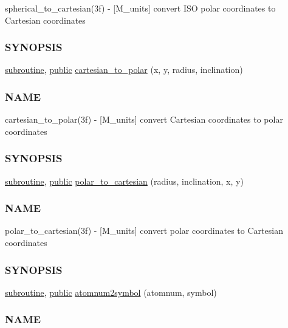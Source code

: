 \begin{DoxyCompactItemize}
\begin{DoxyCompactList}
spherical\+\_\+to\+\_\+cartesian(3f) -\/ \mbox{[}M\+\_\+units\mbox{]} convert I\+SO polar coordinates to Cartesian coordinates \subsubsection*{S\+Y\+N\+O\+P\+S\+IS}\end{DoxyCompactList}\item 
\hyperlink{M__stopwatch_83_8txt_acfbcff50169d691ff02d4a123ed70482}{subroutine}, \hyperlink{M__stopwatch_83_8txt_a2f74811300c361e53b430611a7d1769f}{public} \hyperlink{namespacem__units_a283a11d968cad968e33abfd6889de689}{cartesian\+\_\+to\+\_\+polar} (x, y, radius, inclination)
\begin{DoxyCompactList}\small\item\em \subsubsection*{N\+A\+ME}

cartesian\+\_\+to\+\_\+polar(3f) -\/ \mbox{[}M\+\_\+units\mbox{]} convert Cartesian coordinates to polar coordinates \subsubsection*{S\+Y\+N\+O\+P\+S\+IS}\end{DoxyCompactList}\item 
\hyperlink{M__stopwatch_83_8txt_acfbcff50169d691ff02d4a123ed70482}{subroutine}, \hyperlink{M__stopwatch_83_8txt_a2f74811300c361e53b430611a7d1769f}{public} \hyperlink{namespacem__units_aa8b818c6ad24272b8c946b497041edc9}{polar\+\_\+to\+\_\+cartesian} (radius, inclination, x, y)
\begin{DoxyCompactList}\small\item\em \subsubsection*{N\+A\+ME}

polar\+\_\+to\+\_\+cartesian(3f) -\/ \mbox{[}M\+\_\+units\mbox{]} convert polar coordinates to Cartesian coordinates \subsubsection*{S\+Y\+N\+O\+P\+S\+IS}\end{DoxyCompactList}\item 
\hyperlink{M__stopwatch_83_8txt_acfbcff50169d691ff02d4a123ed70482}{subroutine}, \hyperlink{M__stopwatch_83_8txt_a2f74811300c361e53b430611a7d1769f}{public} \hyperlink{namespacem__units_a09d8d6552dedf64faf635ea0ea6606ab}{atomnum2symbol} (atomnum, symbol)
\begin{DoxyCompactList}\small\item\em \subsubsection*{N\+A\+ME}


\end{DoxyCompactList}
\end{DoxyCompactItemize}
